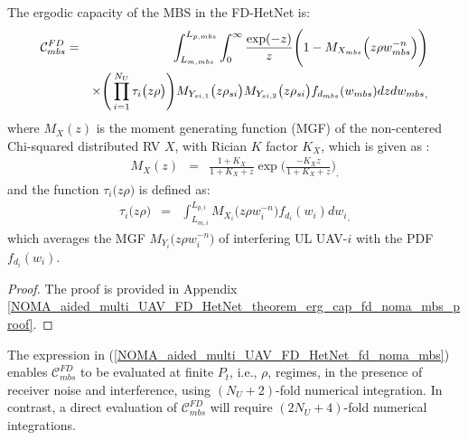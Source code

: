 \begin{theorem} \label{NOMA_aided_multi_UAV_FD_HetNet_theorem_erg_cap_fd_noma_mbs}
The ergodic capacity of the MBS in the FD-HetNet is:
\begin{eqnarray} \label{NOMA_aided_multi_UAV_FD_HetNet_fd_noma_mbs}
\mathcal{C}_{mbs}^{FD} & \hspace{-0.0cm} = & \hspace{-0.0cm} \int_{L_{m,mbs}}^{L_{p,mbs}} \int_{0}^{\infty} \frac{\exp(-z)}{z} \Bigg(1-M_{X_{mbs}}\Big(z\rho  w_{mbs}^{-n}\Big)\Bigg) \nonumber \\
 & & \hspace{0cm} \times \Bigg( \prod_{i=1}^{N_U} \tau_i\big(z\rho\big) \Bigg) M_{Y_{si,1}}\big(z\rho_{si}\big) M_{Y_{si,2}}\big(z\rho_{si} \big) f_{d_{mbs}}(w_{mbs}) {dz dw_{mbs}}_,
\end{eqnarray}
where $M_{X}(z)$ is the moment generating function (MGF) of the non-centered Chi-squared distributed RV $X$, with Rician $K$ factor $K_X$, which is given as \cite[Table. I]{hasna2003performance}:
\begin{eqnarray} 
M_{X}(z) & = & \frac{1+K_X}{1+K_X+z}\exp\bigg(\frac{-K_X z}{1+K_X+z}\bigg)_,
\end{eqnarray}
and the function $\tau_i\big(z\rho\big)$ is defined as: 
\begin{eqnarray} 
\tau_i\big(z\rho\big) & = & \int_{L_{m,i}}^{L_{p,i}} M_{X_i}\Big(z\rho w_i^{-n}\Big) f_{d_i}(w_i) {dw_i}_,
\end{eqnarray}
which averages the MGF $M_{Y_i}\Big(z\rho w_i^{-n}\Big)$ of interfering UL UAV-$i$ with the PDF $f_{d_i}(w_i)$.
\end{theorem}
\begin{proof}
The proof is provided in Appendix \ref{NOMA_aided_multi_UAV_FD_HetNet_theorem_erg_cap_fd_noma_mbs_proof}.
\end{proof}

The expression in (\ref{NOMA_aided_multi_UAV_FD_HetNet_fd_noma_mbs}) enables $\mathcal{C}_{mbs}^{FD}$ to be evaluated at finite $P_t$, i.e., $\rho$, regimes, in the presence of receiver noise and interference, using $(N_U + 2)$-fold numerical integration. In contrast, a direct evaluation of $\mathcal{C}_{mbs}^{FD}$ will require $(2N_U + 4)$-fold numerical integrations. 

